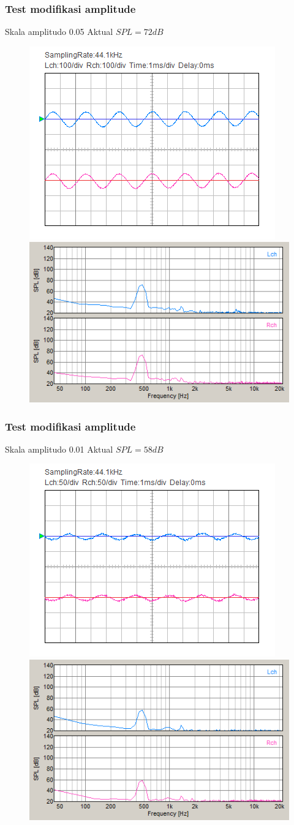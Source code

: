\documentclass[table,dvipsnames,10pt]{beamer}
\begin{document}
	\begin{frame}[fragile]
	\frametitle{Test modifikasi amplitude}
	\begin{exampleblock}{Skala amplitudo 0.05}
		Aktual $SPL = 72 dB$
		\begin{figure}[H]
			\centering
			\includegraphics[width=0.4\linewidth]{result/day_4/500Hz/tone005}
			\includegraphics[width=0.45\linewidth]{result/day_4/500Hz/fft_tone005}
		\end{figure}
	\end{exampleblock}
	\end{frame}

	\begin{frame}[fragile]
	\frametitle{Test modifikasi amplitude}
	\begin{exampleblock}{Skala amplitudo 0.01}
		Aktual $SPL = 58 dB$
		\begin{figure}[H]
			\centering
			\includegraphics[width=0.4\linewidth]{result/day_4/500Hz/tone001}
			\includegraphics[width=0.45\linewidth]{result/day_4/500Hz/fft_tone001}
		\end{figure}
	\end{exampleblock}
	\end{frame}
\end{document}
